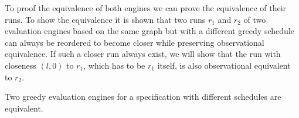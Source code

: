 To proof the equivalence of both engines we can prove the equivalence of their runs.
To show the equivalence it is shown that two runs \(r_1\) and \(r_2\) of two evaluation engines based on the same graph but with a different greedy schedule can always be reordered to become closer while preserving observational equivalence.
If such a closer run always exist, we will show that the run with closeness \((l, 0)\) to \(r_1\), which has to be \(r_1\) itself, is also observational equivalent to \(r_2\).

\begin{theorem}[name = Equivalence of Different Greedy Evaluation Engines]\label{theorem:equivalence_greedy_eval_engines}
  Two greedy evaluation engines for a specification with different schedules are equivalent.
\end{theorem}

